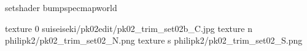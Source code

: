 setshader bumpspecmapworld

texture 0 suiseiseki/pk02edit/pk02_trim_set02b_C.jpg
texture n philipk2/pk02_trim_set02_N.png
texture s philipk2/pk02_trim_set02_S.png

